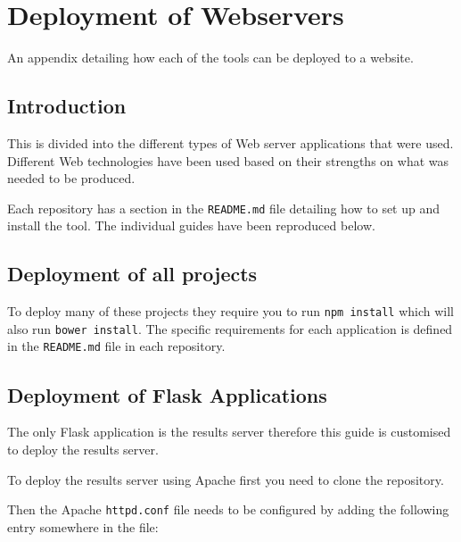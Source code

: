 \chapter{Deployment of Webservers} \label{App:Deployment of Webservers}

\begin{preamble}
An appendix detailing how each of the tools can be deployed to a website.
\end{preamble}

\section{Introduction}

This is divided into the different types of Web server applications that were used. Different Web technologies have been used based on their strengths on what was needed to be produced.

Each repository has a section in the \lstinline|README.md| file detailing how to set up and install the tool. The individual guides have been reproduced below.

\section{Deployment of all projects}

To deploy many of these projects they require you to run \lstinline|npm install| which will also run \lstinline|bower install|. The specific requirements for each application is defined in the \lstinline|README.md| file in each repository.

\section{Deployment of Flask Applications} \label{Section:Deployment Flask Applications}

The only Flask application is the results server therefore this guide is customised to deploy the results server.

To deploy the results server using Apache first you need to clone the repository.

Then the Apache \lstinline|httpd.conf| file needs to be configured by adding the following entry somewhere in the file:


